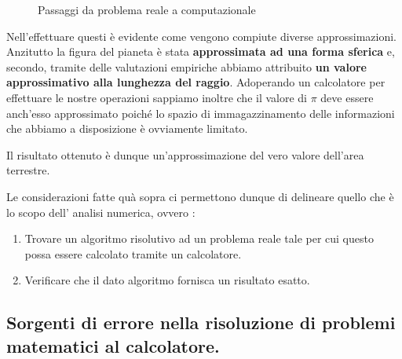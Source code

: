 \documentclass[12pt, a4paper]{book}
\theoremstyle{definition}
\begin{document}
\begin{flushleft}
\begin{figure}[h]
	\caption{Passaggi da problema reale a computazionale}
	\label{schema passaggi}
\end{figure}

Nell'effettuare questi è evidente come vengono compiute diverse approssimazioni.  Anzitutto la figura del pianeta è stata \textbf{approssimata ad una forma sferica} e, secondo,  tramite delle valutazioni empiriche abbiamo attribuito \textbf{un valore approssimativo alla lunghezza del raggio}.  Adoperando un calcolatore per effettuare le nostre operazioni sappiamo inoltre che il valore di $\pi$ deve essere anch'esso approssimato poiché lo spazio di immagazzinamento delle informazioni che abbiamo a disposizione è ovviamente limitato. 

\vfill
Il risultato ottenuto è dunque un'approssimazione del vero valore dell'area terrestre. 

Le considerazioni fatte quà sopra ci permettono dunque di delineare quello che è lo scopo dell' analisi numerica, ovvero :
\begin{enumerate}
  \item Trovare un algoritmo risolutivo ad un problema reale tale per cui questo possa essere calcolato tramite un calcolatore.
  \item Verificare che il dato algoritmo fornisca un risultato esatto. 
\end{enumerate}
\end{flushleft}

\subsection{Sorgenti di errore nella risoluzione di problemi matematici al calcolatore.}
\end{document}
